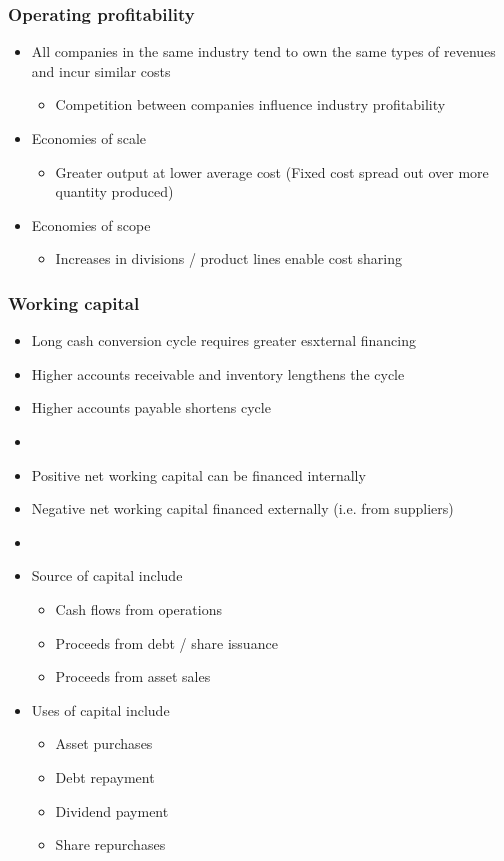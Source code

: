 \documentclass[../notes_compiled.tex]{subfiles}
\begin{document}
\subsubsection{Operating profitability}
\begin{itemize}
\item All companies in the same industry tend to own the same types of revenues and incur similar costs
\begin{itemize}
\item Competition between companies influence industry profitability
\end{itemize}
\item Economies of scale
\begin{itemize}
\item Greater output at lower average cost (Fixed cost spread out over more quantity produced)
\end{itemize}
\item Economies of scope
\begin{itemize}
\item Increases in divisions / product lines enable cost sharing
\end{itemize}
\end{itemize}

\subsubsection{Working capital}
\begin{itemize}
\item Long cash conversion cycle requires greater esxternal financing
\item Higher accounts receivable and inventory lengthens the cycle
\item Higher accounts payable shortens cycle
\item[]
\item Positive net working capital can be financed internally
\item Negative net working capital financed externally (i.e. from suppliers)
\item[]
\item Source of capital include
\begin{itemize}
\item Cash flows from operations
\item Proceeds from debt / share issuance
\item Proceeds from asset sales
\end{itemize}
\item Uses of capital include
\begin{itemize}
\item Asset purchases
\item Debt repayment
\item Dividend payment
\item Share repurchases
\end{itemize}
\end{itemize}
\end{document}
